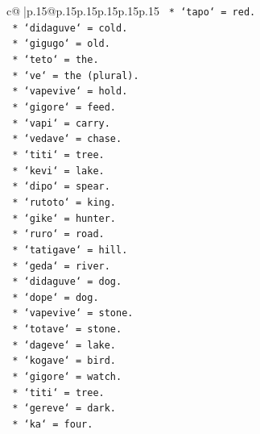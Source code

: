 \documentclass{article}
\begin{document}
{\begin{supertabular}{c@{$\;$}|p{.15\linewidth}@{}p{.15\linewidth}p{.15\linewidth}p{.15\linewidth}p{.15\linewidth}p{.15\linewidth}}
{{{\texttt{                        *   `tapo` = red.} \\
\texttt{                        *   `didaguve` = cold.} \\
\texttt{                        *   `gigugo` = old.} \\
\texttt{                        *   `teto` = the.} \\
\texttt{                        *   `ve` = the (plural).} \\
\texttt{                        *   `vapevive` = hold.} \\
\texttt{                        *   `gigore` = feed.} \\
\texttt{                        *   `vapi` = carry.} \\
\texttt{                        *   `vedave` = chase.} \\
\texttt{                        *   `titi` = tree.} \\
\texttt{                        *   `kevi` = lake.} \\
\texttt{                        *   `dipo` = spear.} \\
\texttt{                        *   `rutoto` = king.} \\
\texttt{                        *   `gike` = hunter.} \\
\texttt{                        *   `ruro` = road.} \\
\texttt{                        *   `tatigave` = hill.} \\
\texttt{                        *   `geda` = river.} \\
\texttt{                        *   `didaguve` = dog.} \\
\texttt{                        *   `dope` = dog.} \\
\texttt{                        *   `vapevive` = stone.} \\
\texttt{                        *   `totave` = stone.} \\
\texttt{                        *   `dageve` = lake.} \\
\texttt{                        *   `kogave` = bird.} \\
\texttt{                        *   `gigore` = watch.} \\
\texttt{                        *   `titi` = tree.} \\
\texttt{                        *   `gereve` = dark.} \\
\texttt{                        *   `ka` = four.} \\
}}}
\end{supertabular}}
\end{document}
